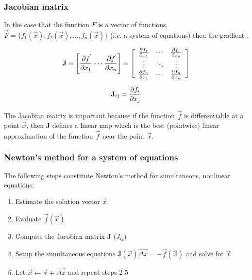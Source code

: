 \documentclass[hyperref={colorlinks=true}]{beamer}
\begin{document}
\begin{frame}%
  \frametitle{Jacobian matrix}

  In the case that the function $F$ is a vector of functions, $\vec{F} = \{f_1(\vec{x}), f_2(\vec{x}), ..., f_n(\vec{x})\}$ (i.e. a system of equations) then the gradient  .
  
  \begin{equation}
    \mathbf {J} = \left[ \partialxone{\vec{f}} \, \cdots \, \partialxn{\vec{f}} \right]%
                = \left[ \begin{array}{c c c}
                             \partialxone{f_1} & \cdots & \partialxn{f_1} \\
                             \vdots            & \ddots & \vdots \\
                             \partialxone{f_n} & \cdots & \partialxn{f_n} 
                           \end{array}\right]
  \end{equation}
  

  \begin{equation}
    \mathbf{J}_{ij}= \frac{\partial f_i}{\partial x_{j}}
  \end{equation}

  The Jacobian matrix is important because if the function $\vec{f}$ is differentiable at a point $\vec{x}$, then $\mathbf{J}$ defines a linear map which is the best (pointwise) linear approximation of the function $\vec{f}$ near the point $\vec{x}$.
  
  \centering {}

\end{frame}


\begin{frame}%
  \frametitle{Newton's method for a system of equations}

  The following steps constitute Newton's method for simultaneous, nonlinear equations:
  
  \begin{enumerate}
    \item Estimate the solution vector $\vec{x}$
    \item Evaluate $\vec{f}(\vec{x})$
    \item Compute the Jacobian matrix $\mathbf{J}$ ($J_{ij}$)
    \item Setup the simultaneous equations $\mathbf{J}(\vec{x}) \vec{\Delta x} = - \vec{f}(\vec{x})$  and solve for $\vec{x}$
    \item Let $\vec{x}\leftarrow \vec{x} + \vec{\Delta x}$ and repeat steps 2-5
  \end{enumerate}

\end{frame}
\end{document}
